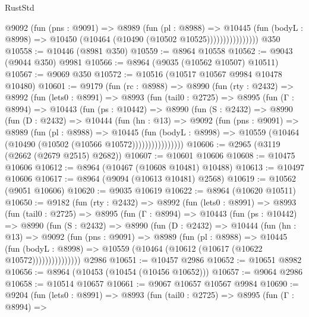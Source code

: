 \begin{lexlean}{RustStd}
\begin{coremodule}
                      @9092
                        (fun (pns : @9091) =>
                        @8989
                          (fun (pl : @8988) =>
                          @10445
                            (fun (bodyL : @8998) =>
                            @10450 (@10464 (@10490 (@10502 @10525))))))))))))))))
    @350
@10558 := @10446 (@8981 @350)
@10559 := @8964 @10558
@10562 := @9043 (@9044 @350) @9981
@10566 := @8964 (@9035 (@10562 @10507) @10511)
@10567 := @9069 @350
@10572 := @10516 (@10517 @10567 @9984 @10478 @10480)
@10601 := @9179
    (fun (rc : @8988) =>
    @8990
      (fun (rty : @2432) =>
      @8992
        (fun (lets0 : @8991) =>
        @8993
          (fun (tail0 : @2725) =>
          @8995
            (fun (Γ : @8994) =>
            @10443
              (fun (ps : @10442) =>
              @8990
                (fun (S : @2432) =>
                @8990
                  (fun (D : @2432) =>
                  @10444
                    (fun (hn : @13) =>
                    @9092
                      (fun (pns : @9091) =>
                      @8989
                        (fun (pl : @8988) =>
                        @10445
                          (fun (bodyL : @8998) =>
                          @10559 (@10464 (@10490 (@10502 (@10566 @10572))))))))))))))))
@10606 := @2965 (@3119 (@2662 (@2679 @2515) @2682))
@10607 := @10601 @10606
@10608 := @10475 @10606
@10612 := @8964 (@10467 (@10608 @10481) @10488)
@10613 := @10497 @10606
@10617 := @8964 (@9094 (@10613 @10481) @2568)
@10619 := @10562 (@9051 @10606)
@10620 := @9035 @10619
@10622 := @8964 (@10620 @10511)
@10650 := @9182
    (fun (rty : @2432) =>
    @8992
      (fun (lets0 : @8991) =>
      @8993
        (fun (tail0 : @2725) =>
        @8995
          (fun (Γ : @8994) =>
          @10443
            (fun (ps : @10442) =>
            @8990
              (fun (S : @2432) =>
              @8990
                (fun (D : @2432) =>
                @10444
                  (fun (hn : @13) =>
                  @9092
                    (fun (pns : @9091) =>
                    @8989
                      (fun (pl : @8988) =>
                      @10445
                        (fun (bodyL : @8998) =>
                        @10559 (@10464 (@10612 (@10617 (@10622 @10572)))))))))))))))
    @2986
@10651 := @10457 @2986
@10652 := @10651 @8982
@10656 := @8964 (@10453 (@10454 (@10456 @10652)))
@10657 := @9064 @2986
@10658 := @10514 @10657
@10661 := @9067 @10657 @10567 @9984
@10690 := @9204
    (fun (lets0 : @8991) =>
    @8993
      (fun (tail0 : @2725) =>
      @8995
        (fun (Γ : @8994) =>

\end{coremodule}
\end{lexlean}
